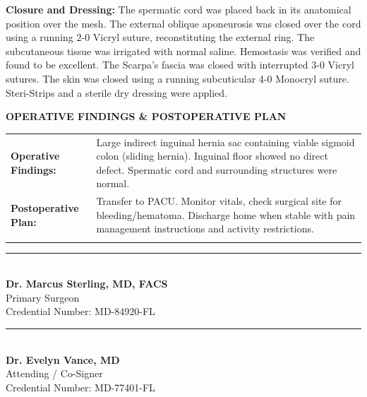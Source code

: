 \documentclass[10pt]{article}
\newcommand{\opsection}[1]{%
  \vspace{1.2em}%
  \begin{tcolorbox}[
    colback=secondarycolor,
    colframe=secondarycolor,
    arc=1mm,
    left=8pt, right=8pt, top=4pt, bottom=4pt,
    boxrule=0pt,
    grow to left by=0pt,
    grow to right by=0pt
  ]
    \color{white}\bfseries\sffamily\fontsize{10}{12}\selectfont #1
  \end{tcolorbox}%
  \vspace{0.4em}%
}
\newcommand{\reporttext}[1]{{\fontsize{9.5}{13.5}\selectfont\sffamily\color{darktext} #1\par}}
\begin{document}
\reporttext{\textbf{Closure and Dressing:} The spermatic cord was placed back in its anatomical position over the mesh. The external oblique aponeurosis was closed over the cord using a running 2-0 Vicryl suture, reconstituting the external ring. The subcutaneous tissue was irrigated with normal saline. Hemostasis was verified and found to be excellent. The Scarpa's fascia was closed with interrupted 3-0 Vicryl sutures. The skin was closed using a running subcuticular 4-0 Monocryl suture. Steri-Strips and a sterile dry dressing were applied.}

\opsection{OPERATIVE FINDINGS \& POSTOPERATIVE PLAN}
\begin{tcolorbox}[
  colback=white,
  colframe=bordercolor,
  arc=1.5mm,
  boxrule=1pt,
  left=10pt, right=10pt, top=8pt, bottom=8pt
]
  \fontsize{9}{12.5}\selectfont\sffamily
  \begin{tabularx}{\textwidth}{@{}l X@{}}
    \textbf{Operative Findings:} & Large indirect inguinal hernia sac containing viable sigmoid colon (sliding hernia). Inguinal floor showed no direct defect. Spermatic cord and surrounding structures were normal. \\[0.4em]
    \textbf{Postoperative Plan:} & Transfer to PACU. Monitor vitals, check surgical site for bleeding/hematoma. Discharge home when stable with pain management instructions and activity restrictions. \\{}
  \end{tabularx}
\end{tcolorbox}

\vspace{2.5em}

\noindent
\begin{minipage}[t]{0.48\textwidth}
  \fontsize{9}{12}\selectfont\sffamily
  \rule{\textwidth}{0.6pt} \\{}
  \textbf{Dr. Marcus Sterling, MD, FACS} \\{}
  Primary Surgeon \\{}
  Credential Number: MD-84920-FL
\end{minipage}
\hfill
\begin{minipage}[t]{0.48\textwidth}
  \fontsize{9}{12}\selectfont\sffamily
  \rule{\textwidth}{0.6pt} \\{}
  \textbf{Dr. Evelyn Vance, MD} \\{}
  Attending / Co-Signer \\{}
  Credential Number: MD-77401-FL
\end{minipage}
\end{document}
